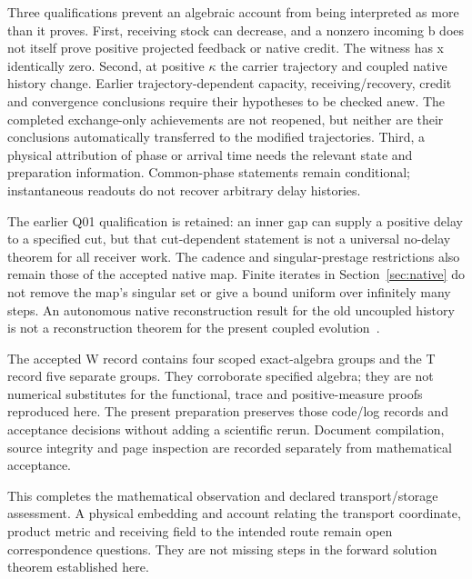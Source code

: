 Three qualifications prevent an algebraic account from being interpreted as more than it proves. First, receiving stock can decrease, and a nonzero incoming b does not itself prove positive projected feedback or native credit. The witness has x identically zero. Second, at positive $\kappa$ the carrier trajectory and coupled native history change. Earlier trajectory-dependent capacity, receiving/recovery, credit and convergence conclusions require their hypotheses to be checked anew. The completed exchange-only achievements are not reopened, but neither are their conclusions automatically transferred to the modified trajectories. Third, a physical attribution of phase or arrival time needs the relevant state and preparation information. Common-phase statements remain conditional; instantaneous readouts do not recover arbitrary delay histories.

The earlier Q01 qualification is retained: an inner gap can supply a positive delay to a specified cut, but that cut-dependent statement is not a universal no-delay theorem for all receiver work. The cadence and singular-prestage restrictions also remain those of the accepted native map. Finite iterates in Section~\ref{sec:native} do not remove the map's singular set or give a bound uniform over infinitely many steps. An autonomous native reconstruction result for the old uncoupled history is not a reconstruction theorem for the present coupled evolution~\cite{CAD,RXhybrid}.

The accepted W record contains four scoped exact-algebra groups and the T record five separate groups. They corroborate specified algebra; they are not numerical substitutes for the functional, trace and positive-measure proofs reproduced here. The present preparation preserves those code/log records and acceptance decisions without adding a scientific rerun. Document compilation, source integrity and page inspection are recorded separately from mathematical acceptance.

This completes the mathematical observation and declared transport/storage assessment. A physical embedding and account relating the transport coordinate, product metric and receiving field to the intended route remain open correspondence questions. They are not missing steps in the forward solution theorem established here.

